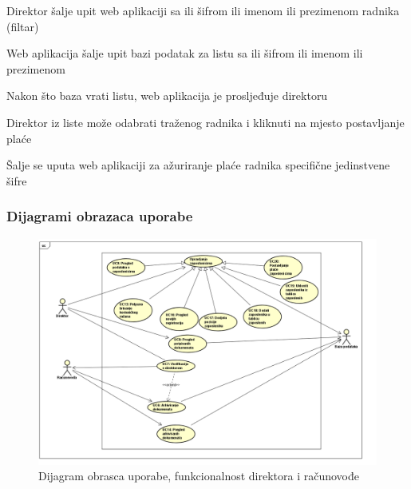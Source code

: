\begin{packed_item}
\begin{packed_item}
\begin{packed_enum}
						\item Direktor šalje upit web aplikaciji sa ili šifrom ili imenom ili prezimenom radnika (filtar)
						\item Web aplikacija šalje upit bazi podatak za listu sa ili šifrom ili imenom ili prezimenom 
						\item Nakon što baza vrati listu, web aplikacija je prosljeđuje direktoru
						\item Direktor iz liste može odabrati traženog radnika i kliknuti na mjesto postavljanje plaće
						\item Šalje se uputa web aplikaciji za ažuriranje plaće radnika specifične jedinstvene šifre
						
					\end{packed_enum}
					
				\end{packed_item}
				
					
				\end{packed_item}

				\pagebreak
				\subsubsection{Dijagrami obrazaca uporabe}
				
				\begin{figure}[H]
					\includegraphics[scale=0.58]{slike/Direktor.png} %
					\centering
					\caption{Dijagram obrasca uporabe, funkcionalnost direktora i računovođe}
					\label{DUC1}
				\end{figure}
			
